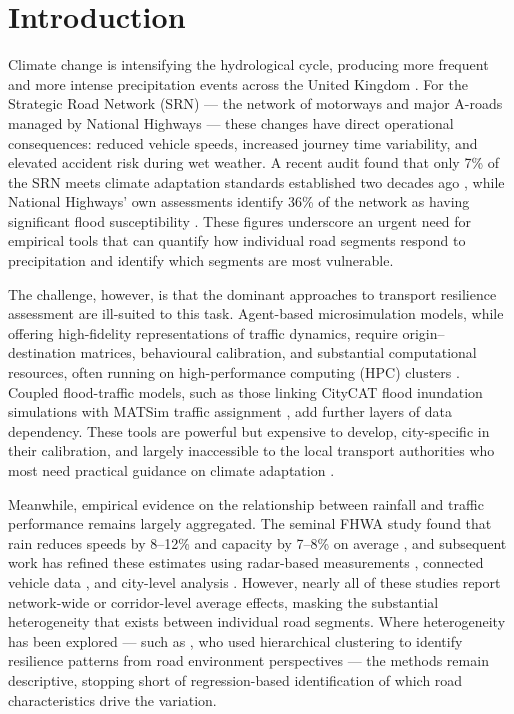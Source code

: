 \documentclass[review]{elsarticle}
\begin{document}
\section{Introduction}
\label{sec:intro}

Climate change is intensifying the hydrological cycle, producing more frequent and more intense precipitation events across the United Kingdom \citep{dft2024rea}. For the Strategic Road Network (SRN) --- the network of motorways and major A-roads managed by National Highways --- these changes have direct operational consequences: reduced vehicle speeds, increased journey time variability, and elevated accident risk during wet weather. A recent audit found that only 7\% of the SRN meets climate adaptation standards established two decades ago \citep{nce2026srn}, while National Highways' own assessments identify 36\% of the network as having significant flood susceptibility \citep{nh2024climate}. These figures underscore an urgent need for empirical tools that can quantify how individual road segments respond to precipitation and identify which segments are most vulnerable.

The challenge, however, is that the dominant approaches to transport resilience assessment are ill-suited to this task. Agent-based microsimulation models, while offering high-fidelity representations of traffic dynamics, require origin--destination matrices, behavioural calibration, and substantial computational resources, often running on high-performance computing (HPC) clusters \citep{huang2022overview,he2026flood}. Coupled flood-traffic models, such as those linking CityCAT flood inundation simulations with MATSim traffic assignment \citep{pregnolato2017depth,farahmand2024integrating}, add further layers of data dependency. These tools are powerful but expensive to develop, city-specific in their calibration, and largely inaccessible to the local transport authorities who most need practical guidance on climate adaptation \citep{unece2024stress}.

Meanwhile, empirical evidence on the relationship between rainfall and traffic performance remains largely aggregated. The seminal FHWA study found that rain reduces speeds by 8--12\% and capacity by 7--8\% on average \citep{hranac2006empirical}, and subsequent work has refined these estimates using radar-based measurements \citep{becker2026rainfall}, connected vehicle data \citep{bi2022weather}, and city-level analysis \citep{cai2016rainfall}. However, nearly all of these studies report network-wide or corridor-level average effects, masking the substantial heterogeneity that exists between individual road segments. Where heterogeneity has been explored --- such as \citet{gao2024resilience}, who used hierarchical clustering to identify resilience patterns from road environment perspectives --- the methods remain descriptive, stopping short of regression-based identification of which road characteristics drive the variation.
\end{document}
